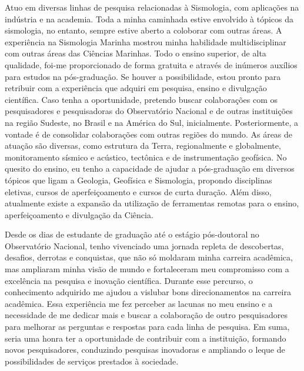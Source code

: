 \documentclass[10pt,a4paper,oneside]{book}
\begin{document}
Atuo em diversas linhas de pesquisa relacionadas à Sismologia, com aplicações na indústria e na academia. Toda a minha caminhada estive envolvido à tópicos da sismologia, no entanto, sempre estive aberto a coloborar com outras áreas. A experiência na Sismologia Marinha mostrou minha habilidade multidisciplinar com outras áreas das Ciências Marinhas. Todo o ensino superior, de alta qualidade, foi-me proporcionado de forma gratuita e através de inúmeros auxílios para estudos na pós-graduação. Se houver a possibilidade, estou pronto para retribuir com a experiência que adquiri em pesquisa, ensino e divulgação científica. Caso tenha a oportunidade, pretendo buscar colaborações com os pesquisadores e pesquisadoras do Observatório Nacional e de outras instituições na região Sudeste, no Brasil e na América do Sul, inicialmente. Posteriormente, a vontade é de consolidar colaborações com outras regiões do mundo. As áreas de atuação são diversas, como estrutura da Terra, regionalmente e globalmente, monitoramento sísmico e acústico, tectônica e de instrumentação geofísica. No quesito do ensino, eu tenho a capacidade de ajudar a pós-graduação em diversos tópicos que ligam a Geologia, Geofísica e Sismologia, propondo disciplinas eletivas, cursos de aperfeiçoamento e cursos de curta duração. Além disso, atualmente existe a expansão da utilização de ferramentas remotas para o ensino, aperfeiçoamento e divulgação da Ciência. 

Desde os dias de estudante de graduação até o estágio pós-doutoral no Observatório Nacional, tenho vivenciado uma jornada repleta de descobertas, desafios, derrotas e conquistas, que não só moldaram minha carreira acadêmica, mas ampliaram minha visão de mundo e fortaleceram meu compromisso com a excelência na pesquisa e inovação científica. Durante esse percurso, o conhecimento adquirido me ajudou a vislubar bons direcionamentos na carreira acadêmica. Essa experiência me fez perceber as lacunas no meu ensino e a necessidade de me dedicar mais e buscar a colaboração de outro pesquisadores para melhorar as perguntas e respostas para cada linha de pesquisa. Em suma, seria uma honra ter a oportunidade de contribuir com a instituição, formando novos pesquisadores, conduzindo pesquisas inovadoras e ampliando o leque de possibilidades de serviços prestados à sociedade.
\end{document}
